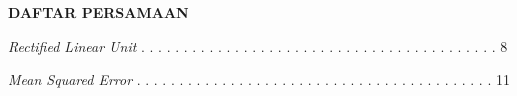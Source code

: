 \newpage %
\begin{center}
    \begin{large}\textbf{DAFTAR PERSAMAAN}\\\end{large}
\end{center}
\vspace{5mm}
\noindent \textit{Rectified Linear Unit}
. . . . . . . . . . . . . . . . . . . . . . . . . . . . . . . . . . . . . . . . . . 8

\noindent \textit{Mean Squared Error}
. . . . . . . . . . . . . . . . . . . . . . . . . . . . . . . . . . . . . . . . . . 11
